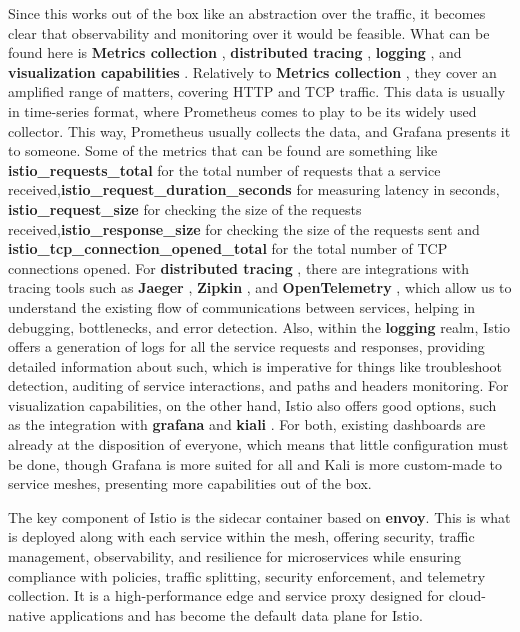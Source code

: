 Since this works out of the box like an abstraction over the traffic, it becomes clear that observability and monitoring over it would be feasible. What can be found here is \textbf{Metrics collection} , \textbf{distributed tracing} , \textbf{logging} , and \textbf{visualization capabilities} . Relatively to \textbf{Metrics collection} , they cover an amplified range of matters, covering HTTP and TCP traffic. This data is usually in time-series format, where Prometheus comes to play to be its widely used collector. This way, Prometheus usually collects the data, and Grafana presents it to someone. Some of the metrics that can be found are something like \textbf{istio\_requests\_total} for the total number of requests that a service received,\textbf{istio\_request\_duration\_seconds} for measuring latency in seconds, \textbf{istio\_request\_size} for checking the size of the requests received,\textbf{istio\_response\_size} for checking the size of the requests sent and \textbf{istio\_tcp\_connection\_opened\_total} for the total number of TCP connections opened. For \textbf{distributed tracing} , there are integrations with tracing tools such as \textbf{Jaeger} , \textbf{Zipkin} , and \textbf{OpenTelemetry} , which allow us to understand the existing flow of communications between services, helping in debugging, bottlenecks, and error detection. Also, within the \textbf{logging} realm, Istio offers a generation of logs for all the service requests and responses, providing detailed information about such, which is imperative for things like troubleshoot detection, auditing of service interactions, and paths and headers monitoring. For visualization capabilities, on the other hand, Istio also offers good options, such as the integration with \textbf{grafana} and \textbf{kiali} . For both, existing dashboards are already at the disposition of everyone, which means that little configuration must be done, though Grafana is more suited for all and Kali is more custom-made to service meshes, presenting more capabilities out of the box.

The key component of Istio is the sidecar container based on \textbf{envoy}. This is what is deployed along with each service within the mesh, offering security, traffic management, observability, and resilience for microservices while ensuring compliance with policies, traffic splitting, security enforcement, and telemetry collection. It is a high-performance edge and service proxy designed for cloud-native applications and has become the default data plane for Istio.

